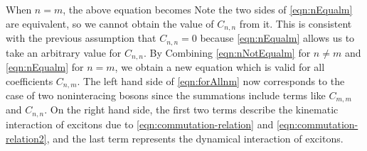 When $n=m$, the above equation becomes
Note the two sides of  \autoref{eqn:nEqualm} are equivalent, so we cannot obtain the value of $C_{n,n}$ from it. 
This is consistent with the previous assumption that $C_{n,n} = 0$ because \autoref{eqn:nEqualm} allows us to take
an arbitrary value for $C_{n,n}$. 
By Combining \autoref{eqn:nNotEqualm} for $n\neq m$ and \autoref{eqn:nEqualm} for $n = m$, we obtain a new 
equation 
which is valid for all coefficients $C_{n, m}$. The left hand side of \autoref{eqn:forAllnm} now corresponds to the case 
of two noninteracing bosons since the summations include terms like $C_{m,m}$ and $C_{n,n}$. On the right hand side,
 the first two terms describe the kinematic interaction of excitons due to \autoref{eqn:commutation-relation} and
 \autoref{eqn:commutation-relation2}, and the last term represents the dynamical interaction of excitons.

